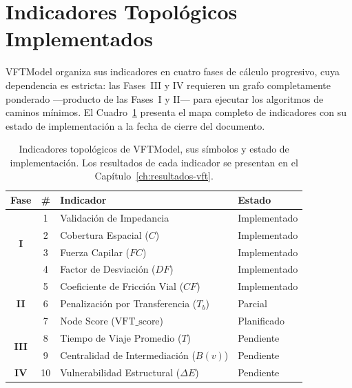 \section{Indicadores Topológicos Implementados}
\label{sec:vft-indicadores}

VFTModel organiza sus indicadores en cuatro fases de cálculo progresivo,
cuya dependencia es estricta: las Fases~III y IV requieren un grafo completamente
ponderado —producto de las Fases~I y II— para ejecutar los algoritmos de caminos
mínimos. El Cuadro~\ref{tab:vft-indicadores-estado} presenta el mapa completo
de indicadores con su estado de implementación a la fecha de cierre del documento.

\begin{table}[H]
    \centering
    \caption[Indicadores topológicos de VFTModel y estado de implementación]{
    Indicadores topológicos de VFTModel, sus símbolos y estado de implementación.
    Los resultados de cada indicador se presentan en el
    Capítulo~\ref{ch:resultados-vft}.}
    \label{tab:vft-indicadores-estado}
    \begin{tabularx}{\textwidth}{|c|c|X|l|}
        \hline
        \textbf{Fase} & \textbf{\#} & \textbf{Indicador} & \textbf{Estado} \\
        \hline
        \multirow{4}{*}{\textbf{I}}
          & 1 & Validación de Impedancia                  & Implementado \\
          & 2 & Cobertura Espacial ($C$)                  & Implementado \\
          & 3 & Fuerza Capilar ($FC$)                     & Implementado \\
          & 4 & Factor de Desviación ($DF$)               & Implementado \\
        \hline
        \multirow{3}{*}{\textbf{II}}
          & 5 & Coeficiente de Fricción Vial ($CF$)       & Implementado \\
          & 6 & Penalización por Transferencia ($T_b$)    & Parcial      \\
          & 7 & Node Score ($\text{VFT\_score}$)          & Planificado  \\
        \hline
        \multirow{2}{*}{\textbf{III}}
          & 8 & Tiempo de Viaje Promedio ($T$)            & Pendiente    \\
          & 9 & Centralidad de Intermediación ($B(v)$)   & Pendiente    \\
        \hline
        \textbf{IV}
          & 10 & Vulnerabilidad Estructural ($\Delta E$) & Pendiente    \\
        \hline
    \end{tabularx}
\end{table}


